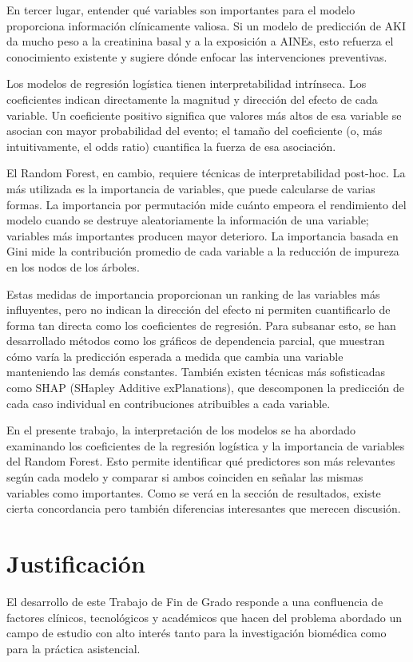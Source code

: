 \documentclass[12pt, a4paper, oneside]{report}
\begin{document}
En tercer lugar, entender qué variables son importantes para el modelo proporciona información clínicamente valiosa. Si un modelo de predicción de AKI da mucho peso a la creatinina basal y a la exposición a AINEs, esto refuerza el conocimiento existente y sugiere dónde enfocar las intervenciones preventivas.

Los modelos de regresión logística tienen interpretabilidad intrínseca. Los coeficientes indican directamente la magnitud y dirección del efecto de cada variable. Un coeficiente positivo significa que valores más altos de esa variable se asocian con mayor probabilidad del evento; el tamaño del coeficiente (o, más intuitivamente, el odds ratio) cuantifica la fuerza de esa asociación.

El Random Forest, en cambio, requiere técnicas de interpretabilidad post-hoc. La más utilizada es la importancia de variables, que puede calcularse de varias formas. La importancia por permutación mide cuánto empeora el rendimiento del modelo cuando se destruye aleatoriamente la información de una variable; variables más importantes producen mayor deterioro. La importancia basada en Gini mide la contribución promedio de cada variable a la reducción de impureza en los nodos de los árboles.

Estas medidas de importancia proporcionan un ranking de las variables más influyentes, pero no indican la dirección del efecto ni permiten cuantificarlo de forma tan directa como los coeficientes de regresión. Para subsanar esto, se han desarrollado métodos como los gráficos de dependencia parcial, que muestran cómo varía la predicción esperada a medida que cambia una variable manteniendo las demás constantes. También existen técnicas más sofisticadas como SHAP (SHapley Additive exPlanations), que descomponen la predicción de cada caso individual en contribuciones atribuibles a cada variable.

En el presente trabajo, la interpretación de los modelos se ha abordado examinando los coeficientes de la regresión logística y la importancia de variables del Random Forest. Esto permite identificar qué predictores son más relevantes según cada modelo y comparar si ambos coinciden en señalar las mismas variables como importantes. Como se verá en la sección de resultados, existe cierta concordancia pero también diferencias interesantes que merecen discusión.

\chapter{Justificación}
\label{chap:justificacion}
El desarrollo de este Trabajo de Fin de Grado responde a una confluencia de factores clínicos, tecnológicos y académicos que hacen del problema abordado un campo de estudio con alto interés tanto para la investigación biomédica como para la práctica asistencial.
\end{document}
